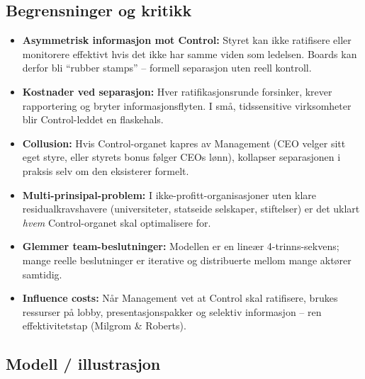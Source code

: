 \subsection*{Begrensninger og kritikk}
\begin{itemize}
\item \textbf{Asymmetrisk informasjon mot Control:} Styret kan ikke ratifisere eller monitorere effektivt hvis det ikke har samme viden som ledelsen. Boards kan derfor bli ``rubber stamps'' -- formell separasjon uten reell kontroll.
\item \textbf{Kostnader ved separasjon:} Hver ratifikasjonsrunde forsinker, krever rapportering og bryter informasjonsflyten. I små, tidssensitive virksomheter blir Control-leddet en flaskehals.
\item \textbf{Collusion:} Hvis Control-organet kapres av Management (CEO velger sitt eget styre, eller styrets bonus følger CEOs lønn), kollapser separasjonen i praksis selv om den eksisterer formelt.
\item \textbf{Multi-prinsipal-problem:} I ikke-profitt-organisasjoner uten klare residualkravshavere (universiteter, statseide selskaper, stiftelser) er det uklart \emph{hvem} Control-organet skal optimalisere for.
\item \textbf{Glemmer team-beslutninger:} Modellen er en lineær 4-trinns-sekvens; mange reelle beslutninger er iterative og distribuerte mellom mange aktører samtidig.
\item \textbf{Influence costs:} Når Management vet at Control skal ratifisere, brukes ressurser på lobby, presentasjonspakker og selektiv informasjon -- ren effektivitetstap (Milgrom \& Roberts).
\end{itemize}

\subsection*{Modell / illustrasjon}

